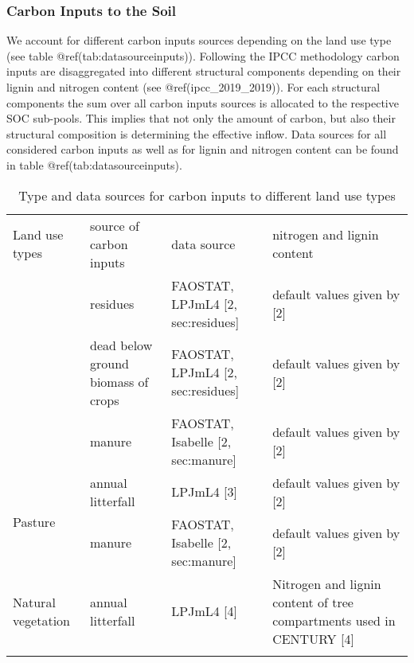 \documentclass[gc, manuscript]{copernicus}
\begin{document}
\hypertarget{sec:carboninputs}{%
\subsubsection{Carbon Inputs to the Soil}\label{sec:carboninputs}}

We account for different carbon inputs sources depending on the land use
type (see table @ref(tab:datasourceinputs)). Following the IPCC
methodology carbon inputs are disaggregated into different structural
components depending on their lignin and nitrogen content (see
@ref(ipcc\_2019\_2019)). For each structural components the sum over all
carbon inputs sources is allocated to the respective SOC sub-pools. This
implies that not only the amount of carbon, but also their structural
composition is determining the effective inflow. Data sources for all
considered carbon inputs as well as for lignin and nitrogen content can
be found in table @ref(tab:datasourceinputs).

 \begin{table*}[h]
 \caption{Type and data sources for carbon inputs to different land use types}
 \begin{tabular}{l l l l}
 \tophline
  Land use types   & source of carbon inputs & data source & nitrogen and lignin content \\
 \middlehline
 \multirow{3}{*}{Cropland} & residues & FAOSTAT, LPJmL4 [2, sec:residues] & default values given by [2]  \\
                            & dead below ground biomass of crops & FAOSTAT, LPJmL4 [2, sec:residues] & default values given by [2] \\
                            & manure & FAOSTAT, Isabelle [2, sec:manure] & default values given by [2] \\
                            \hline
 \multirow{2}{*}{Pasture}  & annual litterfall & LPJmL4 [3] & default values given by [2] \\ 
                            & manure  & FAOSTAT, Isabelle [2, sec:manure] & default values given by [2] \\
                            \hline
  Natural vegetation        & annual litterfall & LPJmL4 [4]& \begin{minipage}[t]{0.28\columnwidth}\raggedright\strut Nitrogen and lignin content of tree compartments used in CENTURY [4] \strut \end{minipage}\tabularnewline
 \bottomhline
 \end{tabular}
 \label{tab:datasourceinputs}
 \belowtable{}
 \end{table*}
\end{document}
